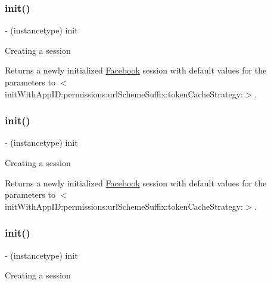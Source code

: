 \subsubsection{\texorpdfstring{init()}{init()}\hspace{0.1cm}{\footnotesize\ttfamily [1/5]}}
{\footnotesize\ttfamily -\/ (instancetype) init \begin{DoxyParamCaption}{ }\end{DoxyParamCaption}}

Creating a session

Returns a newly initialized \hyperlink{interfaceFacebook}{Facebook} session with default values for the parameters to $<$init\+With\+App\+I\+D\+:permissions\+:url\+Scheme\+Suffix\+:token\+Cache\+Strategy\+:$>$. \mbox{\label{interfaceFBSession_ac5ec026f515c232cd4498cf2bc4022b4}} 
\subsubsection{\texorpdfstring{init()}{init()}\hspace{0.1cm}{\footnotesize\ttfamily [2/5]}}
{\footnotesize\ttfamily -\/ (instancetype) init \begin{DoxyParamCaption}{ }\end{DoxyParamCaption}}

Creating a session

Returns a newly initialized \hyperlink{interfaceFacebook}{Facebook} session with default values for the parameters to $<$init\+With\+App\+I\+D\+:permissions\+:url\+Scheme\+Suffix\+:token\+Cache\+Strategy\+:$>$. \mbox{\label{interfaceFBSession_ac5ec026f515c232cd4498cf2bc4022b4}} 
\subsubsection{\texorpdfstring{init()}{init()}\hspace{0.1cm}{\footnotesize\ttfamily [3/5]}}
{\footnotesize\ttfamily -\/ (instancetype) init \begin{DoxyParamCaption}{ }\end{DoxyParamCaption}}

Creating a session

